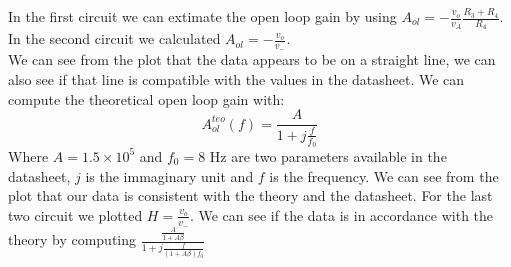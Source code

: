 In the first circuit we can extimate the open loop gain by using $A_{ol} = - \frac{v_{o}}{v_A} \frac{R_3 + R_4}{R_4}$.
In the second circuit we calculated $A_{ol} = - \frac{v_{o}}{v_-}$. \\
We can see from the plot that the data appears to be on a straight line, we can also see if that line is compatible with the values in the datasheet. We can compute the theoretical open loop gain with: $$A_{ol}^{teo}(f) = \frac{A}{1 + j\frac{f}{f_0}}$$ Where $A = 1.5 \times 10^5$ and $f_0 = 8$ Hz are two parameters available in the datasheet, $j$ is the immaginary unit and $f$ is the frequency. We can see from the plot that our data is consistent with the theory and the datasheet.
For the last two circuit we plotted $H = \frac{v_{o}}{v_-}$. We can see if the data is in accordance with the theory by computing $\frac{\frac{A}{1 + A\beta}}{1 + j \frac{f}{(1 + A\beta)f_0}}$